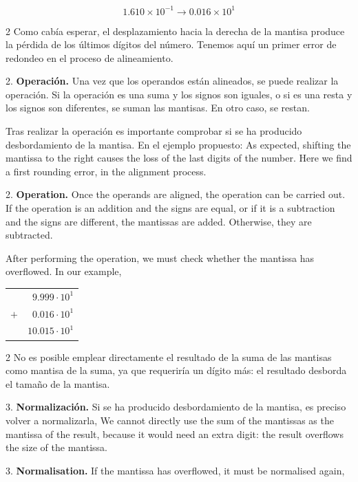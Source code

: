 \begin{equation*}
1.610\times 10^{-1}\rightarrow 0.016\times10^1
\end{equation*}
\begin{paracol}{2}
Como cabía esperar, el desplazamiento hacia la derecha de la mantisa produce la pérdida de los últimos dígitos del número. Tenemos aquí un primer error de redondeo en el proceso de alineamiento.

2. \textbf{Operación.}
Una vez que los operandos están alineados, se puede realizar la operación. Si la operación es una suma y los signos son iguales, o si es una resta y los signos son diferentes, se suman las mantisas. En otro caso, se restan.

Tras realizar la operación es importante comprobar si se ha producido desbordamiento de la mantisa. En el ejemplo propuesto:
\switchcolumn
As expected, shifting the mantissa to the right causes the loss of the last digits of the number. Here we find a first rounding error, in the alignment process.

2. \textbf{Operation.} Once the operands are aligned, the operation can be carried out. If the operation is an addition and the signs are equal, or if it is a subtraction and the signs are different, the mantissas are added. Otherwise, they are subtracted.

After performing the operation, we must check whether the mantissa has overflowed. In our example,
\end{paracol}
\begin{center}
\begin{tabular}{r r}
&$9.999\cdot10^1$\\
$+$&$0.016\cdot10^1$\\
\hline
&$10.015\cdot10^1$
\end{tabular}
\end{center}

\begin{paracol}{2}
No es posible emplear directamente el resultado de la suma de las mantisas como mantisa de la suma, ya que requeriría un dígito más: el resultado desborda el tamaño de la mantisa.

3. \textbf{Normalización.}
Si se ha producido desbordamiento de la mantisa, es preciso volver a normalizarla,
\switchcolumn
We cannot directly use the sum of the mantissas as the mantissa of the result, because it would need an extra digit: the result overflows the size of the mantissa.

3. \textbf{Normalisation.}
If the mantissa has overflowed, it must be normalised again,
\end{paracol}

